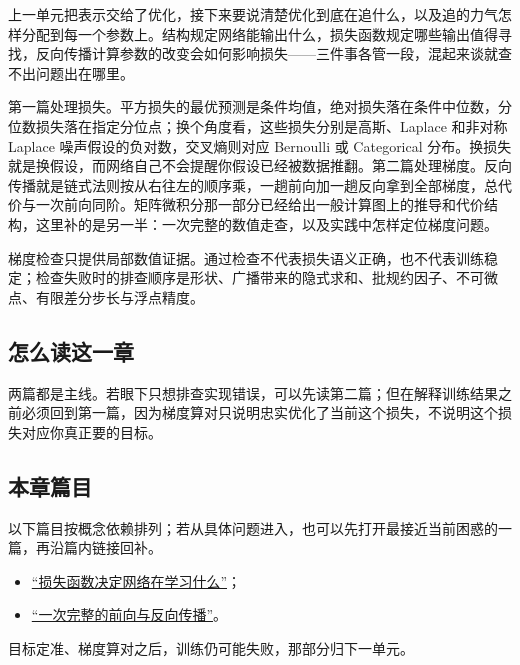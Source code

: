 上一单元把表示交给了优化，接下来要说清楚优化到底在追什么，以及追的力气怎样分配到每一个参数上。结构规定网络能输出什么，损失函数规定哪些输出值得寻找，反向传播计算参数的改变会如何影响损失——三件事各管一段，混起来谈就查不出问题出在哪里。

第一篇处理损失。平方损失的最优预测是条件均值，绝对损失落在条件中位数，分位数损失落在指定分位点；换个角度看，这些损失分别是高斯、Laplace 和非对称 Laplace 噪声假设的负对数，交叉熵则对应 Bernoulli 或 Categorical 分布。换损失就是换假设，而网络自己不会提醒你假设已经被数据推翻。第二篇处理梯度。反向传播就是链式法则按从右往左的顺序乘，一趟前向加一趟反向拿到全部梯度，总代价与一次前向同阶。矩阵微积分那一部分已经给出一般计算图上的推导和代价结构，这里补的是另一半：一次完整的数值走查，以及实践中怎样定位梯度问题。

梯度检查只提供局部数值证据。通过检查不代表损失语义正确，也不代表训练稳定；检查失败时的排查顺序是形状、广播带来的隐式求和、批规约因子、不可微点、有限差分步长与浮点精度。

\subsection{怎么读这一章}

两篇都是主线。若眼下只想排查实现错误，可以先读第二篇；但在解释训练结果之前必须回到第一篇，因为梯度算对只说明忠实优化了当前这个损失，不说明这个损失对应你真正要的目标。

\subsection{本章篇目}

以下篇目按概念依赖排列；若从具体问题进入，也可以先打开最接近当前困惑的一篇，再沿篇内链接回补。

\begin{itemize}
\tightlist
\item \hyperref[sec:14-Deep-Learning/02-Losses-and-Backpropagation/01]{``损失函数决定网络在学习什么''}；
\item \hyperref[sec:14-Deep-Learning/02-Losses-and-Backpropagation/02]{``一次完整的前向与反向传播''}。
\end{itemize}

目标定准、梯度算对之后，训练仍可能失败，那部分归下一单元。
